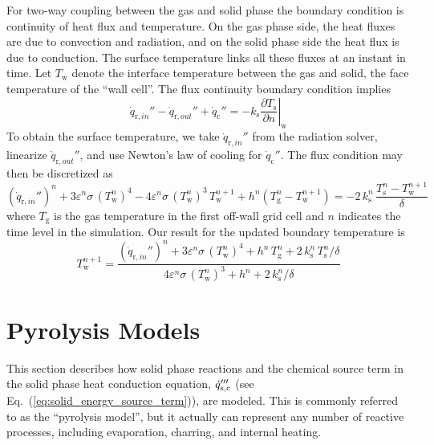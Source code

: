 For two-way coupling between the gas and solid phase the boundary condition is continuity of heat flux and temperature.  On the gas phase side, the heat fluxes are due to convection and radiation, and on the solid phase side the heat flux is due to conduction.  The surface temperature links all these fluxes at an instant in time.  Let $T_{\mathrm{w}}$ denote the interface temperature between the gas and solid, the face temperature of the ``wall cell''.  The flux continuity boundary condition implies
\begin{equation}
\label{eq:fluxcontinuity}
\dot{q}_{{\mathrm{r}}, in}'' - \dot{q}_{{\mathrm{r}}, out}'' + \dot{q}_{\mathrm{c}}'' = -k_{\mathrm{s}} \left. \frac{\partial T_{\mathrm{s}}}{\partial n} \right|_{\mathrm{w}}
\end{equation}
To obtain the surface temperature, we take $\dot{q}_{{\mathrm{r}}, in}''$ from the radiation solver, linearize $\dot{q}_{{\mathrm{r}}, out}''$, and use Newton's law of cooling for $\dot{q}_{\mathrm{c}}''$. The flux condition may then be discretized as
\begin{equation}
\label{eq:discflux}
( \dot{q}_{{\mathrm{r}}, in}'' )^n + 3 \varepsilon^n \sigma \, (T_{\mathrm{w}}^n)^4 - 4 \varepsilon^n \sigma \, (T_{\mathrm{w}}^n)^3 \, T_{\mathrm{w}}^{n+1} + h^n (T_{\mathrm{g}}^n - T_{\mathrm{w}}^{n+1}) = -2 \, k_{\mathrm{s}}^n \, \frac{T_{\mathrm{s}}^n - T_{\mathrm{w}}^{n+1}}{\delta}
\end{equation}
where $T_{\mathrm{g}}$ is the gas temperature in the first off-wall grid cell and $n$ indicates the time level in the simulation.  Our result for the updated boundary temperature is
\begin{equation}
\label{eq:tmpwall}
T_{\mathrm{w}}^{n+1} = \frac{ ( \dot{q}_{{\mathrm{r}}, in}'' )^n + 3 \varepsilon^n \sigma \, (T_{\mathrm{w}}^n)^4 + h^n \, T_{\mathrm{g}}^n + 2 \, k_{\mathrm{s}}^n \, T_{\mathrm{s}}^n/\delta }{ 4 \varepsilon^n \sigma \, (T_{\mathrm{w}}^n)^3 + h^n + 2 \, k_{\mathrm{s}}^n / \delta}
\end{equation}



\newpage
\section{Pyrolysis Models}
\label{pyrosection}

This section describes how solid phase reactions and the chemical source term in the solid phase heat conduction equation, $\dot{q}_{\rm s,c}'''$ (see Eq.~(\ref{eq:solid_energy_source_term})),  are modeled. This is commonly referred to as the ``pyrolysis model'', but it actually can represent any number of reactive processes, including evaporation, charring, and internal heating.


